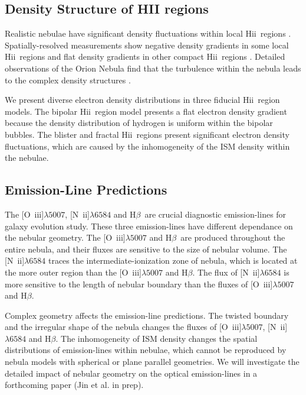 \documentclass[twocolumn]{aastex62}
\newcommand{\hb}{H$\beta$}    %
\newcommand{\oiii}{[O~{\sc iii}]}
\newcommand{\nii}{[N~{\sc ii}]}
\newcommand{\hiireg}{{H{\sc ii}}}
\begin{document}
\begin{CJK*}{UTF8}{gbsn}
\subsection{Density Structure of HII regions}

Realistic nebulae have significant density fluctuations within local \hiireg\ regions \citep{Perez-2001,Simpson-2004,McLeod-2016,Peimbert-2019}.
Spatially-resolved measurements show negative density gradients in some local \hiireg\ regions \citep{Kurtz-2002,Phillips-2007,Rubin-2011} and flat density gradients in other compact \hiireg\ regions \citep{Garcia-Benito-2010,Ramos-Larios-2010}.
Detailed observations of the Orion Nebula find that the turbulence within the nebula leads to the complex density structures \citep{Arthur-2016, O'Dell-2017,Kewley-2019}.

We present diverse electron density distributions in three fiducial \hiireg\ region models.
The bipolar \hiireg\ region model presents a flat electron density gradient because the density distribution of hydrogen is uniform within the bipolar bubbles.
The blister and fractal \hiireg\ regions present significant electron density fluctuations, which are caused by the inhomogeneity of the ISM density within the nebulae.


\subsection{Emission-Line Predictions}


The \oiii$\lambda5007$, \nii$\lambda6584$ and \hb\ are crucial diagnostic emission-lines for galaxy evolution study.
These three emission-lines have different dependance on the nebular geometry.
The \oiii$\lambda5007$ and \hb\ are produced throughout the entire nebula, and their fluxes are sensitive to the size of nebular volume.
The \nii$\lambda6584$ traces the intermediate-ionization zone of nebula, which is located at the more outer region than the \oiii$\lambda5007$ and \hb .
The flux of \nii$\lambda6584$ is more sensitive to the length of nebular boundary than the fluxes of \oiii$\lambda5007$ and \hb .

Complex geometry affects the emission-line predictions.
The twisted boundary and the irregular shape of the nebula changes the fluxes of \oiii$\lambda5007$, \nii$\lambda6584$ and \hb .
The inhomogeneity of ISM density changes the spatial distributions of emission-lines within nebulae, which cannot be reproduced by nebula models with spherical or plane parallel geometries.
We will investigate the detailed impact of nebular geometry on the optical emission-lines in a
forthcoming paper (Jin et al. in prep).


\end{CJK*}
\end{document}
